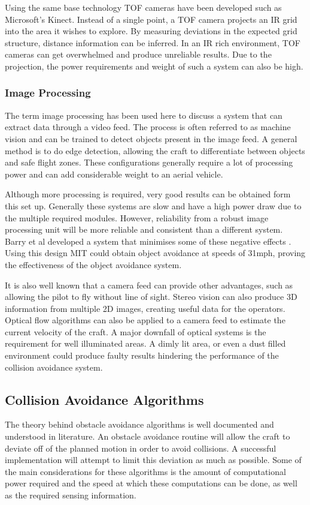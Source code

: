 		Using the same base technology TOF cameras have been developed such as Microsoft's Kinect. Instead of a single point, a TOF camera projects an IR grid into the area it wishes to explore. By measuring deviations in the expected grid structure, distance information can be inferred. In an IR rich environment, TOF cameras can get overwhelmed and produce unreliable results. Due to the projection, the power requirements and weight of such a system can also be high.
	
		\subsubsection{Image Processing}
		The term image processing has been used here to discuss a system that can extract data through a video feed. The process is often referred to as machine vision and can be trained to detect objects present in the image feed. A general method is to do edge detection, allowing the craft to differentiate between objects and safe flight zones. These configurations generally require a lot of processing power and can add considerable weight to an aerial vehicle.
		
		Although more processing is required, very good results can be obtained form this set up. Generally these systems are slow and have a high power draw due to the multiple required modules. However, reliability from a robust image processing unit will be more reliable and consistent than a different system. Barry et al developed a system that minimises some of these negative effects \cite{Barry2015}. Using this design MIT could obtain object avoidance at speeds of 31mph, proving the effectiveness of the object avoidance system.
		
		It is also well known that a camera feed can provide other advantages, such as allowing the pilot to fly without line of sight. Stereo vision can also produce 3D information from multiple 2D images, creating useful data for the operators. Optical flow algorithms can also be applied to a camera feed to estimate the current velocity of the craft. A major downfall of optical systems is the requirement for well illuminated areas. A dimly lit area, or even a dust filled environment could produce faulty results hindering the performance of the collision avoidance system.
		
	\subsection{Collision Avoidance Algorithms}\label{ObAvoidLit}
	The theory behind obstacle avoidance algorithms is well documented and understood in literature. An obstacle avoidance routine will allow the craft to deviate off of the planned motion in order to avoid collisions. A successful implementation will attempt to limit this deviation as much as possible. Some of the main considerations for these algorithms is the amount of computational power required and the speed at which these computations can be done, as well as the required sensing information.
	
